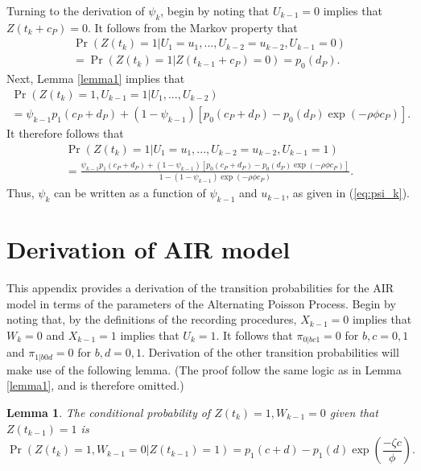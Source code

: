 \documentclass[man, noextraspace, floatsintext]{apa6}\usepackage[]{graphicx}\usepackage[]{color}
\newtheorem{lemma}{Lemma}
\begin{document}
Turning to the derivation of $\psi_k$, begin by noting that $U_{k-1} = 0$ implies that $Z(t_k + c_P) = 0$. 
It follows from the Markov property that 
\begin{multline*}
\Pr\left(Z(t_k) = 1 \left| U_1 = u_1,...,U_{k-2} = u_{k-2}, U_{k-1} = 0 \right.\right) \\ 
= \Pr\left(Z(t_k) = 1 \left| Z(t_{k-1} + c_P) = 0 \right.\right) = p_0(d_P).
\end{multline*}
Next, Lemma \ref{lemma1} implies that \begin{multline*}
\Pr\left(Z(t_k) = 1, U_{k-1} = 1 \left| U_1,...,U_{k-2} \right.\right) \\
= \psi_{k-1} p_1(c_P + d_P) + (1 - \psi_{k-1}) \left[p_0(c_P + d_P) - p_0(d_P) \exp\left(-\rho\phi c_P\right)\right].
\end{multline*}
It therefore follows that 
\begin{multline*}
\Pr\left(Z(t_k) = 1 \left| U_1 = u_1,...,U_{k-2} = u_{k-2}, U_{k-1} = 1 \right.\right) \\
= \frac{\psi_{k-1} p_1(c_P + d_P) + (1 - \psi_{k-1}) \left[p_0(c_P + d_P) - p_0(d_P) \exp\left(-\rho\phi c_P\right)\right]}{1 - (1 - \psi_{k-1})\exp\left(-\rho\phi c_P\right)}.
\end{multline*}
Thus, $\psi_k$ can be written as a function of $\psi_{k-1}$ and $u_{k-1}$, as given in (\ref{eq:psi_k}).

\section{Derivation of AIR model}
\label{app:AIR_derivation}

This appendix provides a derivation of the transition probabilities for the AIR model in terms of the parameters of the Alternating Poisson Process. Begin by noting that, by the definitions of the recording procedures, $X_{k-1} = 0$ implies that $W_k = 0$ and $X_{k-1} = 1$ implies that $U_k = 1$. It follows that $\pi_{0|bc1} = 0$ for $b,c = 0,1$ and $\pi_{1|b0d} = 0$ for $b,d=0,1$. Derivation of the other transition probabilities will make use of the following lemma. (The proof follow the same logic as in Lemma \ref{lemma1}, and is therefore omitted.)

\begin{lemma}
\label{lemma2}
The conditional probability of $Z(t_k) = 1, W_{k-1} = 0$ given that $Z(t_{k-1}) = 1$ is
\[
\Pr\left(Z(t_k) = 1, W_{k-1} = 0 \left| Z(t_{k-1}) = 1 \right.\right) = p_1(c + d) - p_1(d) \exp\left(\frac{- \zeta c}{\phi}\right). \]
\end{lemma}
\end{document}
